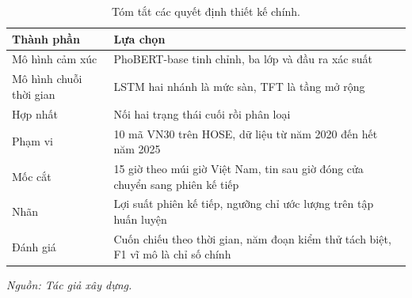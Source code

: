 \begin{table}[H]
  \centering
  \caption{Tóm tắt các quyết định thiết kế chính.}
  \label{tab:cau-hinh}
  \begin{tabular}{p{4cm} p{9cm}}
    \toprule
    Thành phần & Lựa chọn \\
    \midrule
    Mô hình cảm xúc & PhoBERT-base tinh chỉnh, ba lớp và đầu ra xác suất \\
    Mô hình chuỗi thời gian & LSTM hai nhánh là mức sàn, TFT là tầng mở rộng \\
    Hợp nhất & Nối hai trạng thái cuối rồi phân loại \\
    Phạm vi & 10 mã VN30 trên HOSE, dữ liệu từ năm 2020 đến hết năm 2025 \\
    Mốc cắt & 15 giờ theo múi giờ Việt Nam, tin sau giờ đóng cửa chuyển sang phiên kế tiếp \\
    Nhãn & Lợi suất phiên kế tiếp, ngưỡng chỉ ước lượng trên tập huấn luyện \\
    Đánh giá & Cuốn chiếu theo thời gian, năm đoạn kiểm thử tách biệt, F1 vĩ mô là chỉ số chính \\
    \bottomrule
  \end{tabular}
\noindent\textit{Nguồn: Tác giả xây dựng.}
\end{table}
